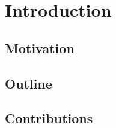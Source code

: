 \chapter{Introduction}


\section{Motivation}

%
%
%
%
%
%
%
%

\section{Outline}

\section{Contributions}